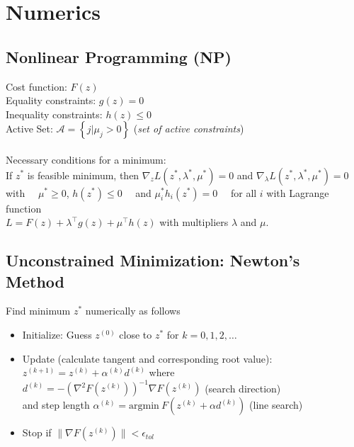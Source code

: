 \documentclass[english]{latex4ei/latex4ei_sheet}
\begin{document}
\section{Numerics}
\begin{sectionbox}

\subsection{Nonlinear Programming (NP)}
Cost function: $F(z)$\\
Equality constraints: $g(z)=0$\\
Inequality constraints: $h(z)\leq 0$\\
Active Set: $\mathcal{A}=\left\{j | \mu_{j}>0\right\}$ (\textit{set of active constraints})\\
\\
Necessary conditions for a minimum:\\
If $z^{*}$ is feasible minimum, then $\nabla_{z} L\left(z^{*}, \lambda^{*}, \mu^{*}\right)=0$ and $\nabla_{\lambda} L\left(z^{*}, \lambda^{*}, \mu^{*}\right)=0\quad$ with $\quad\mu^{*} \geq 0$, $h\left(z^{*}\right) \leq 0\quad$ and $\mu_{i}^{*} h_{i}\left(z^{*}\right)=0\quad$ for all $i$ with Lagrange function\\ $L=F(z)+\lambda^{\top} g(z)+\mu^{\top} h(z)$ with multipliers $\lambda$ and $\mu$.\\

\subsection{Unconstrained Minimization: Newton's Method}
Find minimum $z^{*}$ numerically as follows
\begin{itemize}
    \item Initialize: Guess $z^{(0)}$ close to $z^{*}$ for $k=0,1,2,\ldots$
    \item Update (calculate tangent and corresponding root value):\\
    $z^{(k+1)}=z^{(k)}+\alpha^{(k)} d^{(k)}$ where\\ $d^{(k)}=-\left(\nabla^{2} F\left(z^{(k)}\right)\right)^{-1} \nabla F\left(z^{(k)}\right)$ (search direction)\\
    and step length $\alpha^{(k)}=\textrm{argmin}\ F(z^{(k)}+\alpha d^{(k)})$ (line search)
    \item Stop if $\|\nabla F(z^{(k)})\|<\epsilon_{tol}$
\end{itemize}\vspace{0.2cm}


\end{sectionbox}
\end{document}
